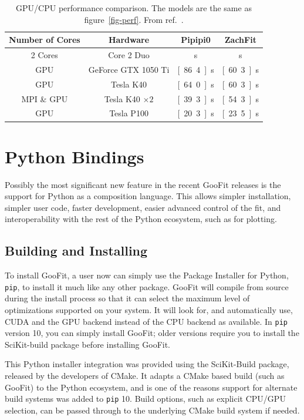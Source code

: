 \documentclass{webofc}
\begin{document}
\begin{table}[h]
	\centering
    \caption{GPU/CPU performance comparison. The models are the same as figure~\ref{fig-perf}. From ref.~\cite{procedings:acat2017}.}
	\begin{tabular}{cccc}
		\toprule
		Number of Cores & Hardware & Pipipi0 & ZachFit \\
		\midrule
2 Cores &           Core 2 Duo & \unit[1,159]{s} & \unit[738]{s} \\
GPU &  GeForce GTX 1050 Ti & \unit[86.4]{s}& \unit[60.3]{s}   \\
GPU &            Tesla K40 & \unit[64.0]{s} & \unit[60.3]{s} \\
MPI \& GPU & Tesla K40 $\times 2$ & \unit[39.3]{s} & \unit[54.3]{s} \\
GPU &           Tesla P100 & \unit[20.3]{s}& \unit[23.5]{s} \\
\bottomrule
	\end{tabular}
\label{tab-zachfit}
\end{table}


\section{Python Bindings}
\label{sec-py}

Possibly the most significant new feature in the recent GooFit releases is the support for Python as a composition language. This allows simpler installation, simpler user code, faster development, easier advanced control of the fit, and interoperability with the rest of the Python ecosystem, such as for plotting.

\subsection{Building and Installing}

To install GooFit, a user now can simply use the Package Installer for Python, \texttt{pip}, to install it much like any other package. GooFit will compile from source during the install process so that it can select the maximum level of optimizations supported on your system. It will look for, and automatically use, CUDA and the GPU backend instead of the CPU backend as available. In \texttt{pip} version 10, you can simply install GooFit; older versions require you to install the SciKit-build package before installing GooFit.

This Python installer integration was provided using the SciKit-Build package, released by the developers of CMake. It adapts a CMake based build (such as GooFit) to the Python ecosystem, and is one of the reasons support for alternate build systems was added to \texttt{pip} 10. Build options, such as explicit CPU/GPU selection, can be passed through to the underlying CMake build system if needed.
\end{document}
